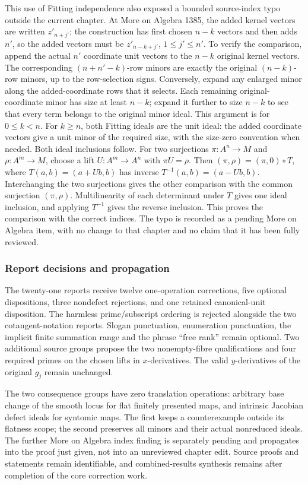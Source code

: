 This use of Fitting independence also exposed a bounded source-index typo outside the current chapter. At More on Algebra 1385, the added kernel vectors are written \(z'_{n+j'}\); the construction has first chosen \(n-k\) vectors and then adds \(n'\), so the added vectors must be \(z'_{n-k+j'}\), \(1\le j'\le n'\). To verify the comparison, append the actual \(n'\) coordinate unit vectors to the \(n-k\) original kernel vectors. The corresponding \((n+n'-k)\)-row minors are exactly the original \((n-k)\)-row minors, up to the row-selection signs. Conversely, expand any enlarged minor along the added-coordinate rows that it selects. Each remaining original-coordinate minor has size at least \(n-k\); expand it further to size \(n-k\) to see that every term belongs to the original minor ideal. This argument is for \(0\le k<n\). For \(k\ge n\), both Fitting ideals are the unit ideal: the added coordinate vectors give a unit minor of the required size, with the size-zero convention when needed. Both ideal inclusions follow. For two surjections \(\pi:A^n\to M\) and \(\rho:A^m\to M\), choose a lift \(U:A^m\to A^n\) with \(\pi U=\rho\). Then \((\pi,\rho)=(\pi,0)\circ T\), where \(T(a,b)=(a+Ub,b)\) has inverse \(T^{-1}(a,b)=(a-Ub,b)\). Interchanging the two surjections gives the other comparison with the common surjection \((\pi,\rho)\). Multilinearity of each determinant under \(T\) gives one ideal inclusion, and applying \(T^{-1}\) gives the reverse inclusion. This proves the comparison with the correct indices. The typo is recorded as a pending More on Algebra item, with no change to that chapter and no claim that it has been fully reviewed.

\subsubsection{Report decisions and propagation}\label{report-decisions-and-propagation}

The twenty-one reports receive twelve one-operation corrections, five optional dispositions, three nondefect rejections, and one retained canonical-unit disposition. The harmless prime/subscript ordering is rejected alongside the two cotangent-notation reports. Slogan punctuation, enumeration punctuation, the implicit finite summation range and the phrase ``free rank'' remain optional. Two additional source groups propose the two nonempty-fibre qualifications and four required primes on the chosen lifts in \(x\)-derivatives. The valid \(y\)-derivatives of the original \(g_j\) remain unchanged.

The two consequence groups have zero translation operations: arbitrary base change of the smooth locus for flat finitely presented maps, and intrinsic Jacobian defect ideals for syntomic maps. The first keeps a counterexample outside its flatness scope; the second preserves all minors and their actual nonreduced ideals. The further More on Algebra index finding is separately pending and propagates into the proof just given, not into an unreviewed chapter edit. Source proofs and statements remain identifiable, and combined-results synthesis remains after completion of the core correction work.
